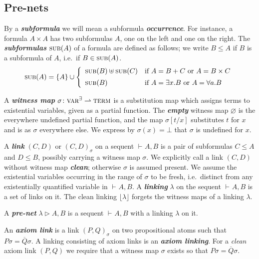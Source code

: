 \documentclass[UKenglish]{lipics-v2016}
\theoremstyle{plain}
\newcommand\defn[1]{\textit{\textbf{#1}}}
\newcommand\floor[1]{\lfloor#1\rfloor}
\newcommand\varE{\textsc{var}^\exists}
\newcommand\terms{\textsc{term}}
\newcommand\subs[1]{\textsc{sub}(#1)}
\newcommand\+{+}
\renewcommand\*{\times}
\newcommand\dual[1]{\overline{#1}}
\newcommand\sub{\leq}
\newcommand\seq[3][]{{\vdash_{#1}}#2,#3}
\newcommand\net[3]{#1\triangleright #2,#3}
\newcommand\link[3][\sigma]{(#2,#3)_{#1}}
\begin{document}

\subsection{Pre-nets}

By a \defn{subformula} we will mean a subformula \defn{occurrence}. For instance, a formula $A\*A$ has two subformulas $A$, one on the left and one on the right. The \defn{subformulas} $\subs A$ of a formula are defined as follows; we write $B\sub A$ if $B$ is a subformula of $A$, i.e.\ if $B\in\subs A$.
\[
	\subs A = \{A\} \cup
	\left\{\begin{array}{ll}
		\subs B\uplus\subs C	& \text{if $A=B\+C$ or $A=B\*C$} \\[5pt]
		\subs B					& \text{if $A=\exists x.B$ or $A=\forall a.B$}
	\end{array}\right.
\]

A \defn{witness map} $\sigma\colon \varE \rightharpoonup \terms$ is a substitution map which assigns terms to existential variables, given as a partial function. The \defn{empty} witness map $\varnothing$ is the everywhere undefined partial function, and the map $\sigma[t/x]$ substitutes $t$ for $x$ and is as $\sigma$ everywhere else. We express by $\sigma(x)=\bot$ that $\sigma$ is undefined for $x$.

A \defn{link} $(C,D)$ or $\link CD$ on a sequent $\seq AB$ is a pair of subformulas $C\leq A$ and $D\leq B$, possibly carrying a witness map $\sigma$. We explicitly call a link $(C,D)$ without witness map \defn{clean}; otherwise $\sigma$ is assumed present. We assume the existential variables occurring in the range of $\sigma$ to be fresh, i.e.\ distinct from any existentially quantified variable in $\seq AB$. A \defn{linking} $\lambda$ on the sequent $\seq AB$ is a set of links on it. The clean linking $\floor\lambda$ forgets the witness maps of a linking $\lambda$. 

\begin{definition}
A \defn{pre-net} $\net\lambda AB$ is a sequent $\seq AB$ with a linking $\lambda$ on it.
\end{definition}

An \defn{axiom link} is a link $\link PQ$ on two propositional atoms such that $P\sigma=\dual Q\sigma$. A linking consisting of axiom links is an \defn{axiom linking}. For a \emph{clean} axiom link $(P,Q)$ we require that a witness map $\sigma$ exists so that $P\sigma=\dual Q\sigma$.
\end{document}
